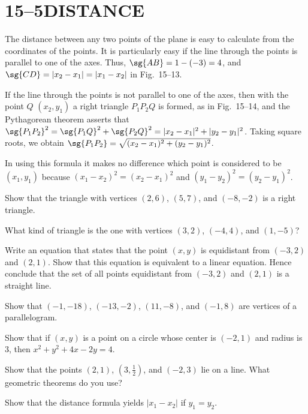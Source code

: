 \documentclass[11pt]{book}
\theoremstyle{bkplain}
\theoremstyle{XIplainnote}
\theoremstyle{bkplain}
\theoremstyle{bkplain}
\begin{document}
\section*{15--5\quad DISTANCE}

The distance between any two points of the plane is easy to calculate from the
coordinates of the points. It is particularly easy if the line through the
points is parallel to one of the axes. Thus, $\sg{AB} = 1 - (-3) = 4$, and
$\sg{CD} = |x_2 - x_1| = |x_1 - x_2|$ in Fig.~15--13.

\FIGXVTHIRTEENFOURTEEN

If the line through the points is not parallel to one of the axes, then with
the point $Q$ $(x_2, y_1)$ a right triangle $P_1P_2Q$ is formed, as in
Fig.~15--14, and the Pythagorean theorem asserts that
$\sg{P_1P_2}^2 = \sg{P_1Q}^2 + \sg{P_2Q}^2 = |x_2 - x_1|^2 +
|y_2 - y_1|^2$. Taking square roots, we obtain
$\sg{P_1P_2} = \sqrt{(x_2-x_1)^2 + (y_2-y_1)^2}$.

\begin{remark}
In using this formula it makes no difference which point is considered to be
$(x_1, y_1)$ because $(x_1 - x_2)^2 = (x_2 - x_1)^2$ and
$(y_1 - y_2)^2 = (y_2 - y_1)^2$.
\end{remark}

\begin{exercisecols}
\begin{exlist}
\item Show that the triangle with vertices $(2, 6)$, $(5, 7)$, and
  $(-8, -2)$ is a right triangle.
\item What kind of triangle is the one with vertices $(3, 2)$, $(-4, 4)$, and
  $(1, -5)$?
\item[\stex 3.] Write an equation that states that the point $(x, y)$ is
  equidistant from $(-3, 2)$ and $(2, 1)$. Show that this equation is
  equivalent to a linear equation. Hence conclude that the set of all points
  equidistant from $(-3, 2)$ and $(2, 1)$ is a straight line.
\item[4.] Show that $(-1, -18)$, $(-13, -2)$, $(11, -8)$, and $(-1, 8)$ are
  vertices of a parallelogram.
\setcounter{exlisti}{4}
\item Show that if $(x, y)$ is a point on a circle whose center is $(-2, 1)$
  and radius is 3, then $x^2 + y^2 + 4x - 2y = 4$.
\item Show that the points $(2, 1)$, $(3, \tfrac{1}{2})$, and $(-2, 3)$ lie on
  a line. What geometric theorems do you use?
\item Show that the distance formula yields $|x_1 - x_2|$ if $y_1 = y_2$.
\end{exlist}
\end{exercisecols}
\end{document}
